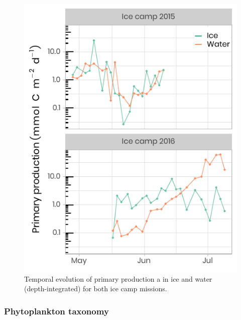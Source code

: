 \documentclass[essd, manuscript]{copernicus}
\begin{document}
\begin{figure}[H]
	\centering
	\includegraphics[scale = 1]{../../../../graphs/fig11.pdf}
	\caption{Temporal evolution of primary production a in ice and water (depth-integrated) for both ice camp missions.}
\end{figure}

\subsubsection{Phytoplankton taxonomy}
\end{document}
